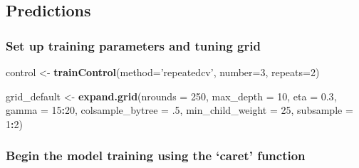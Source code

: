 \documentclass[]{article}
\newenvironment{Shaded}{\begin{snugshade}}{\end{snugshade}}
\newcommand{\CommentTok}[1]{\textcolor[rgb]{0.56,0.35,0.01}{\textit{#1}}}
\newcommand{\DataTypeTok}[1]{\textcolor[rgb]{0.13,0.29,0.53}{#1}}
\newcommand{\DecValTok}[1]{\textcolor[rgb]{0.00,0.00,0.81}{#1}}
\newcommand{\FloatTok}[1]{\textcolor[rgb]{0.00,0.00,0.81}{#1}}
\newcommand{\KeywordTok}[1]{\textcolor[rgb]{0.13,0.29,0.53}{\textbf{#1}}}
\newcommand{\NormalTok}[1]{#1}
\newcommand{\OperatorTok}[1]{\textcolor[rgb]{0.81,0.36,0.00}{\textbf{#1}}}
\newcommand{\StringTok}[1]{\textcolor[rgb]{0.31,0.60,0.02}{#1}}
\begin{document}
\hypertarget{predictions}{%
\subsection{Predictions}\label{predictions}}

\hypertarget{set-up-training-parameters-and-tuning-grid}{%
\subsubsection{Set up training parameters and tuning
grid}\label{set-up-training-parameters-and-tuning-grid}}

\begin{Shaded}
\begin{Highlighting}[]
\NormalTok{control <-}\StringTok{ }\KeywordTok{trainControl}\NormalTok{(}\DataTypeTok{method=}\StringTok{'repeatedcv'}\NormalTok{,}
                        \DataTypeTok{number=}\DecValTok{3}\NormalTok{,}
                        \DataTypeTok{repeats=}\DecValTok{2}\NormalTok{)}

\NormalTok{grid_default <-}\StringTok{ }\KeywordTok{expand.grid}\NormalTok{(}\DataTypeTok{nrounds =} \DecValTok{250}\NormalTok{,}
                            \DataTypeTok{max_depth =} \DecValTok{10}\NormalTok{,}
                            \DataTypeTok{eta =} \FloatTok{0.3}\NormalTok{,}
                            \DataTypeTok{gamma =} \DecValTok{15}\OperatorTok{:}\DecValTok{20}\NormalTok{,}
                            \DataTypeTok{colsample_bytree =} \FloatTok{.5}\NormalTok{,}
                            \DataTypeTok{min_child_weight =} \DecValTok{25}\NormalTok{,}
                            \DataTypeTok{subsample =} \DecValTok{1}\OperatorTok{:}\DecValTok{2}\NormalTok{)}
\end{Highlighting}
\end{Shaded}

\hypertarget{begin-the-model-training-using-the-caret-function}{%
\subsubsection{Begin the model training using the `caret'
function}\label{begin-the-model-training-using-the-caret-function}}

\begin{Shaded}
\end{Shaded}
\end{document}
